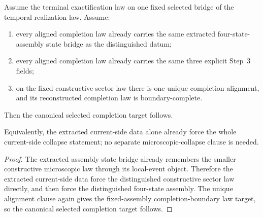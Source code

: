 \begin{theorem}
\label{thm:canonical-selected-completion-from-current-boundary-route}
Assume the terminal exactification law on one fixed selected bridge of the
temporal realization law. Assume:
\begin{enumerate}
\item every aligned completion law already carries the same extracted
four-state-assembly state bridge as the distinguished datum;
\item every aligned completion law already carries the same three explicit
Step~3 fields;
\item on the fixed constructive sector law there is one unique completion
alignment, and its reconstructed completion law is boundary-complete.
\end{enumerate}
Then the canonical selected completion target follows.

Equivalently, the extracted current-side data alone already force the whole
current-side collapse statement; no separate microscopic-collapse clause is
needed.
\end{theorem}

\begin{proof}
The extracted assembly state bridge already remembers the smaller constructive
microscopic law through its local-event object. Therefore the extracted
current-side data force the distinguished constructive sector law directly, and
then force the distinguished four-state assembly. The unique alignment clause again
gives the fixed-assembly completion-boundary law target, so the canonical
selected completion target follows.
\end{proof}

